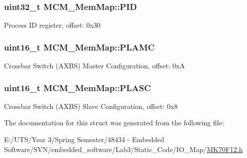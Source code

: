 \subsubsection[{P\+I\+D}]{\setlength{\rightskip}{0pt plus 5cm}uint32\+\_\+t M\+C\+M\+\_\+\+Mem\+Map\+::\+P\+I\+D}\label{struct_m_c_m___mem_map_a41b1890f596f706bcd94c2d49c1e44f7}
Process I\+D register, offset\+: 0x30 \hypertarget{struct_m_c_m___mem_map_a7d749b910777a6b67ea94f2379c628ee}{}
\subsubsection[{P\+L\+A\+M\+C}]{\setlength{\rightskip}{0pt plus 5cm}uint16\+\_\+t M\+C\+M\+\_\+\+Mem\+Map\+::\+P\+L\+A\+M\+C}\label{struct_m_c_m___mem_map_a7d749b910777a6b67ea94f2379c628ee}
Crossbar Switch (A\+X\+B\+S) Master Configuration, offset\+: 0x\+A \hypertarget{struct_m_c_m___mem_map_ad68f64d82524bb0b181a837967b8e248}{}
\subsubsection[{P\+L\+A\+S\+C}]{\setlength{\rightskip}{0pt plus 5cm}uint16\+\_\+t M\+C\+M\+\_\+\+Mem\+Map\+::\+P\+L\+A\+S\+C}\label{struct_m_c_m___mem_map_ad68f64d82524bb0b181a837967b8e248}
Crossbar Switch (A\+X\+B\+S) Slave Configuration, offset\+: 0x8 

The documentation for this struct was generated from the following file\+:\begin{DoxyCompactItemize}
\item 
E\+:/\+U\+T\+S/\+Year 3/\+Spring Semester/48434 -\/ Embedded Software/\+S\+V\+N/embedded\+\_\+software/\+Lab3/\+Static\+\_\+\+Code/\+I\+O\+\_\+\+Map/\hyperlink{_m_k70_f12_8h}{M\+K70\+F12.\+h}\end{DoxyCompactItemize}
